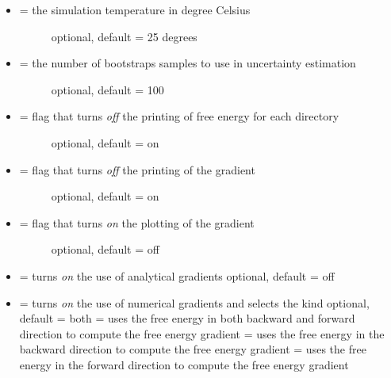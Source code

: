 \documentclass[letterpaper,10pt,english]{sphinxmanual}
\begin{document}
\begin{itemize}
\begin{description}
\end{description}

\item {} \begin{description}
\item[{ = the simulation temperature in degree Celsius}] \leavevmode
optional, default = 25 degrees

\end{description}

\item {} \begin{description}
\item[{ = the number of bootstraps samples to use in uncertainty estimation}] \leavevmode
optional, default = 100

\end{description}

\item {} \begin{description}
\item[{  = flag that turns \emph{off} the printing of free energy for each directory}] \leavevmode
optional, default = on

\end{description}

\item {} \begin{description}
\item[{  = flag that turns \emph{off} the printing of the gradient}] \leavevmode
optional, default = on

\end{description}

\item {} \begin{description}
\item[{  = flag that turns \emph{on} the plotting of the gradient}] \leavevmode
optional, default = off

\end{description}

\item {} 
 = turns \emph{on} the use of analytical gradients
optional, default = off

\item {} 
 = turns \emph{on} the use of numerical gradients and selects the kind
optional, default = both
 = uses the free energy in both backward and forward direction to compute the free energy gradient
 = uses the free energy in the backward direction to compute the free energy gradient
 = uses the free energy in the forward direction to compute the free energy gradient

\end{itemize}
\end{document}
